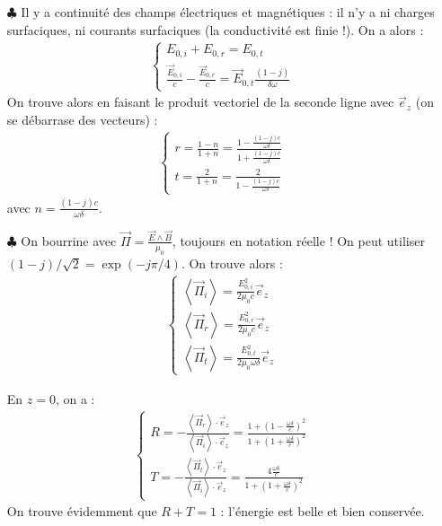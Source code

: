 \documentclass{report}
\begin{document}
\begin{itemize}
	\item[$\clubsuit$] Il y a continuité des champs électriques et magnétiques : il n'y a ni charges surfaciques, ni courants surfaciques (la conductivité est finie !). On a alors :
	\begin{align}
    \begin{cases}
        E_{0,i} + E_{0,r} =E_{0,t}\\
     	\frac{\vec{E}_{0,i}}{c} - \frac{\vec{E}_{0,r}}{c} =\vec{E}_{0,t}\frac{(1-j)}{\delta\omega}
    \end{cases}  
	\end{align}
	On trouve alors en faisant le produit vectoriel de la seconde ligne avec $\vec{e}_z$ (on se débarrase des vecteurs) :
	\begin{align}
    \begin{cases}
        r=\frac{1-n}{1+n}=\frac{1-\frac{(1-j)c}{\omega\delta}}{1+\frac{(1-j)c}{\omega\delta}}\\
     	t=\frac{2}{1+n}=\frac{2}{1-\frac{(1-j)c}{\omega\delta}}
    \end{cases}  
	\end{align}
	avec $n=\frac{(1-j)c}{\omega\delta}$. 
		
	\item[$\clubsuit$] On bourrine avec $\vec{\Pi}=\frac{\vec{E}\wedge\vec{B}}{\mu_0}$, toujours en notation réelle ! On peut utiliser $(1-j)/\sqrt{2}=\exp(-j\pi/4)$.
	On trouve alors :
	\begin{align}
    \begin{cases}
        \left\langle \vec{\Pi}_i\right\rangle =\frac{E_{0,i}^2}{2\mu_0c}\vec{e}_z\\
     	\left\langle \vec{\Pi}_r\right\rangle=\frac{E_{0,r}^2}{2\mu_0c}\vec{e}_z\\
     	\left\langle \vec{\Pi}_t\right\rangle= \frac{E_{0,t}^2}{2\mu_0\omega\delta}\vec{e}_z
     \end{cases}  
	\end{align}
	
	En $z=0$, on a :
	\begin{align}
    \begin{cases}
        R=-\frac{\left\langle \vec{\Pi}_r\right\rangle\cdot\vec{e}_z}{\left\langle \vec{\Pi}_i\right\rangle\cdot\vec{e}_z}=\frac{1+\left( 1-\frac{\omega\delta}{c}\right)^2}{1+\left(1+\frac{\omega\delta}{c}\right)^2}\\
     	T=-\frac{\left\langle \vec{\Pi}_t\right\rangle\cdot\vec{e}_z}{\left\langle \vec{\Pi}_i\right\rangle\cdot\vec{e}_z}=\frac{4\frac{\omega\delta}{c}}{1+\left(1+\frac{\omega\delta}{c}\right)^2}
    \end{cases}  
	\end{align}	
	On trouve évidemment que $R+T=1$ : l'énergie est belle et bien conservée. 
	

\end{itemize}
\end{document}
